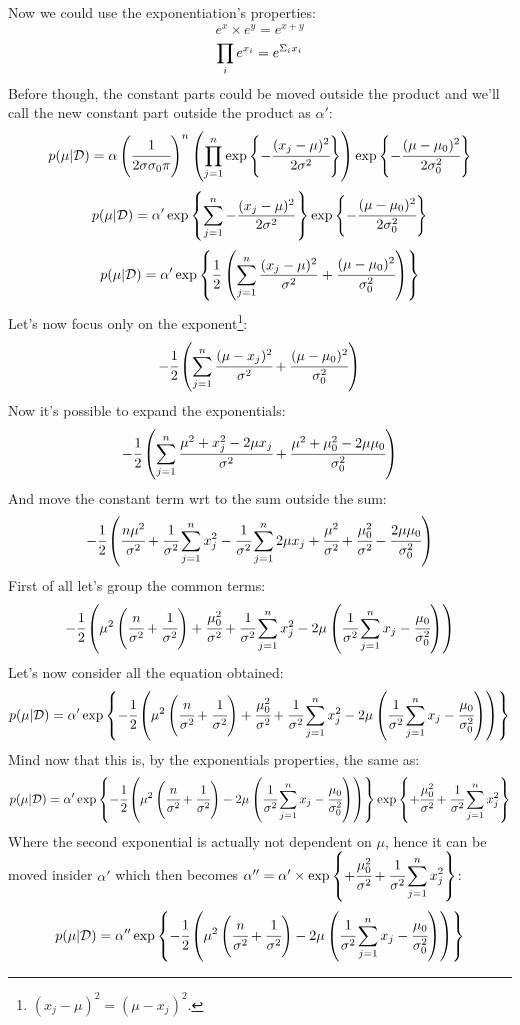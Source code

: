 Now we could use the exponentiation's properties:
\[e^x\times e^y=e^{x+y}\]
\[\displaystyle\prod_i e^{x_i}=e^{\Sigma_i x_i}\]
Before though, the constant parts could be moved outside the product and we'll call the new constant part outside the product as $\alpha'$:
\[
	p(\mu\vert\mathcal{D})=\alpha \left(\cfrac{1}{2\sigma\sigma_0\pi}\right)^n\left(\Prod_{j=1}^n \exp{-\cfrac{(x_j-\mu)^2}{2\sigma^2}}\right)\exp{-\cfrac{(\mu-\mu_0)^2}{2\sigma_0^2}}
\]
\[
	p(\mu\vert\mathcal{D})=\alpha' \exp{\Sum_{j=1}^n-\frac{(x_j-\mu)^2}{2\sigma^2}}\exp {-\cfrac{(\mu-\mu_0)^2}{2\sigma_0^2}}
\]
\[
	p(\mu\vert\mathcal{D})=\alpha' \exp{\frac{1}{2}\left(\Sum_{j=1}^n\frac{(x_j-\mu)^2}{\sigma^2} +\cfrac{(\mu-\mu_0)^2}{\sigma_0^2}\right)}
\]
Let's now focus only on the exponent\footnote{$(x_j-\mu)^2=(\mu-x_j)^2$.}:
\[
	-\cfrac{1}{2}\left(\displaystyle\sum_{j=1}^n\cfrac{(\mu-x_j)^2}{\sigma^2}+\cfrac{(\mu-\mu_0)^2}{\sigma_0^2}\right)
\]
Now it's possible to expand the exponentials:
\[
	-\cfrac{1}{2}\left(\displaystyle\sum_{j=1}^n\cfrac{\mu^2+x_j^2-2\mu x_j}{\sigma^2}+\cfrac{\mu^2+\mu_0^2-2\mu\mu_0}{\sigma_0^2}\right)
\]
And move the constant term wrt to the sum outside the sum:
\[
	-\cfrac{1}{2}\left(\cfrac{n\mu^2}{\sigma^2}+\cfrac{1}{\sigma^2}\displaystyle\sum_{j=1}^nx_j^2-\cfrac{1}{\sigma^2}\displaystyle\sum_{j=1}^n2\mu x_j+\cfrac{\mu^2}{\sigma^2}+\cfrac{\mu_0^2}{\sigma^2}-\cfrac{2\mu\mu_0}{\sigma_0^2}\right)
\]
First of all let's group the common terms:
\[
	-\cfrac{1}{2}\left(\mu^2\left(\cfrac{n}{\sigma^2}+\cfrac{1}{\sigma^2}\right)+\cfrac{\mu_0^2}{\sigma^2}+\cfrac{1}{\sigma^2}\displaystyle\sum_{j=1}^nx_j^2-2\mu\left(\cfrac{1}{\sigma^2}\displaystyle\sum_{j=1}^n x_j-\cfrac{\mu_0}{\sigma_0^2}\right)\right)
\]
Let's now consider all the equation obtained:
\[
	p(\mu\vert\mathcal{D})=\alpha' \exp{-\cfrac{1}{2}\left(\mu^2\left(\cfrac{n}{\sigma^2}+\cfrac{1}{\sigma^2}\right)+\cfrac{\mu_0^2}{\sigma^2}+\cfrac{1}{\sigma^2}\Sum_{j=1}^nx_j^2-2\mu\left(\cfrac{1}{\sigma^2}\Sum_{j=1}^n x_j-\cfrac{\mu_0}{\sigma_0^2}\right)\right)}
\]
Mind now that this is, by the exponentials properties, the same as:
\[
	p(\mu\vert\mathcal{D})=\alpha' \exp{-\cfrac{1}{2}\left(\mu^2\left(\cfrac{n}{\sigma^2}+\cfrac{1}{\sigma^2}\right)-2\mu\left(\cfrac{1}{\sigma^2}\Sum_{j=1}^n x_j-\cfrac{\mu_0}{\sigma_0^2}\right)\right)}\exp{+\cfrac{\mu_0^2}{\sigma^2}+\cfrac{1}{\sigma^2}\Sum_{j=1}^nx_j^2}
\]
Where the second exponential is actually not dependent on $\mu$, hence it can be moved insider $\alpha'$ which then becomes $\alpha''=\alpha'\times\exp{+\cfrac{\mu_0^2}{\sigma^2}+\cfrac{1}{\sigma^2}\Sum_{j=1}^nx_j^2}$:
\[
	p(\mu\vert\mathcal{D})=\alpha'' \exp{-\cfrac{1}{2}\left(\mu^2\left(\cfrac{n}{\sigma^2}+\cfrac{1}{\sigma^2}\right)-2\mu\left(\cfrac{1}{\sigma^2}\Sum_{j=1}^n x_j-\cfrac{\mu_0}{\sigma_0^2}\right)\right)}
\]
